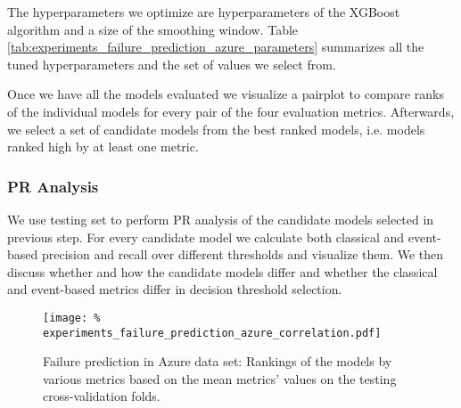 The hyperparameters we optimize are hyperparameters of the XGBoost algorithm and a size of the smoothing window.
Table \ref{tab:experiments_failure_prediction_azure_parameters} summarizes all the tuned hyperparameters and the set of values we select from.

Once we have all the models evaluated we visualize a pairplot to compare ranks of the individual models for every pair of the four evaluation metrics.
Afterwards, we select a set of candidate models from the best ranked models, i.e. models ranked high by at least one metric.

\subsubsection{PR Analysis}

We use testing set to perform PR analysis of the candidate models selected in previous step.
For every candidate model we calculate both classical and event-based precision and recall over different thresholds and visualize them.
We then discuss whether and how the candidate models differ and whether the classical and event-based metrics differ in decision threshold selection.

\begin{figure}[H]
	\centering
    \texttt{[image: \%
        experiments\_failure\_prediction\_azure\_correlation.pdf]}
	\caption{Failure prediction in Azure data set: Rankings of the models by various metrics based on the mean metrics' values on the testing cross-validation folds.}
	\label{fig:experiments_failure_prediction_azure_correlation}
\end{figure}

